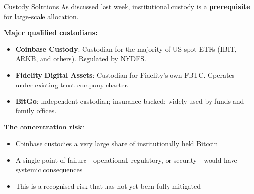 \documentclass[10pt]{beamer}
\newcommand{\highlight}[1]{\textcolor{AccentOrange}{\textbf{#1}}}
\begin{document}
\begin{frame}{Custody Solutions}
  As discussed last week, institutional custody is a \highlight{prerequisite} for large-scale allocation.
  
  \vspace{0.5em}
  \textbf{Major qualified custodians:}
  \begin{itemize}
    \item \textbf{Coinbase Custody}: Custodian for the majority of US spot ETFs (IBIT, ARKB, and others). Regulated by NYDFS.
    \item \textbf{Fidelity Digital Assets}: Custodian for Fidelity's own FBTC. Operates under existing trust company charter.
    \item \textbf{BitGo}: Independent custodian; insurance-backed; widely used by funds and family offices.
  \end{itemize}
  
  \vspace{0.5em}
  \textbf{The concentration risk:}
  \begin{itemize}
    \item Coinbase custodies a very large share of institutionally held Bitcoin
    \item A single point of failure---operational, regulatory, or security---would have systemic consequences
    \item This is a recognised risk that has not yet been fully mitigated
  \end{itemize}
\end{frame}
\end{document}

